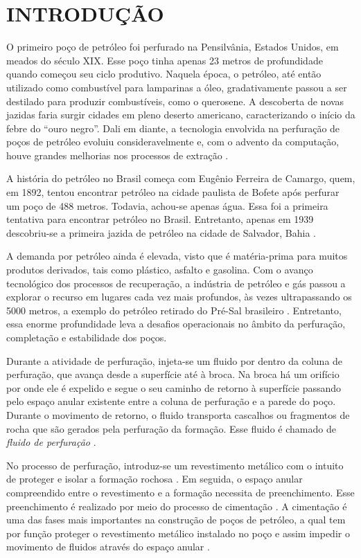 \section{INTRODUÇÃO}

O primeiro poço de petróleo foi perfurado na Pensilvânia, Estados Unidos, em meados do século XIX. Esse poço tinha apenas 23 metros de profundidade quando começou seu ciclo produtivo. Naquela época, o petróleo, até então utilizado como combustível para lamparinas a óleo, gradativamente passou a ser destilado para produzir combustíveis, como o querosene. A descoberta de novas jazidas faria surgir cidades em pleno deserto americano, caracterizando o início da febre do ``ouro negro''. Dali em diante, a tecnologia envolvida na perfuração de poços de petróleo evoluiu consideravelmente e, com o advento da computação, houve grandes melhorias nos processos de extração \cite{Max}.

A história do petróleo no Brasil começa com Eugênio Ferreira de Camargo, quem, em 1892, tentou encontrar petróleo na cidade paulista de Bofete após perfurar um poço de 488 metros. Todavia, achou-se apenas água. Essa foi a primeira tentativa para encontrar petróleo no Brasil. Entretanto, apenas em 1939 descobriu-se a primeira jazida de petróleo na cidade de Salvador, Bahia \cite{Danilo}.

A demanda por petróleo ainda é elevada, visto que é matéria-prima para muitos produtos derivados, tais como plástico, asfalto e gasolina. Com o avanço tecnológico dos processos de recuperação, a indústria de petróleo e gás passou a explorar o recurso em lugares cada vez mais profundos, às vezes ultrapassando os 5000 metros, a exemplo do petróleo retirado do Pré-Sal brasileiro \cite{Petrobras}. Entretanto, essa enorme profundidade leva a desafios operacionais no âmbito da perfuração, completação e estabilidade dos poços.

Durante a atividade de perfuração, injeta-se um fluido por dentro da coluna de perfuração, que avança desde a superfície até à broca. Na broca há um orifício por onde ele é expelido e segue o seu caminho de retorno à superfície passando pelo espaço anular existente entre a coluna de perfuração e a parede do poço. Durante o movimento de retorno, o fluido transporta cascalhos ou fragmentos de rocha que são gerados pela perfuração da formação. Esse fluido é chamado de \textit{fluido de perfuração} \cite{Escudier}.

No processo de perfuração, introduz-se um revestimento metálico com o intuito de proteger e isolar a formação rochosa \cite{KOEHLER}. Em seguida, o espaço anular compreendido entre o revestimento e a formação necessita de preenchimento. Esse preenchimento é realizado por meio do processo de cimentação \cite{SANTOS}. A cimentação é uma das fases mais importantes na  construção de poços de petróleo, a qual tem por função proteger o revestimento metálico instalado no poço e assim impedir o movimento de fluidos através do espaço anular \cite{Bourgoyne}. 

